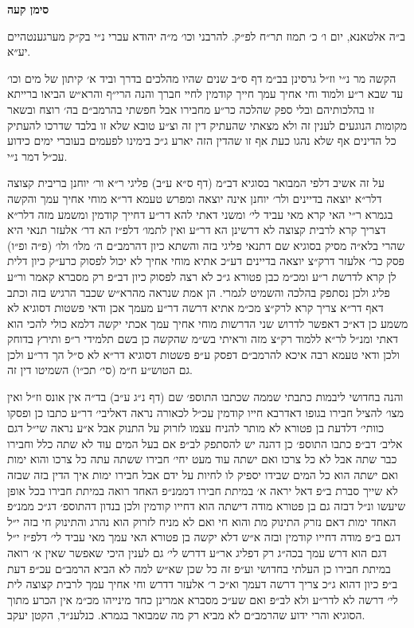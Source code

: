 \documentclass[12pt, openany]{book}
\newcommand{\chapname}{}
\newcommand{\newchap}[1]{
	\addcontentsline{toc}{chapter}{#1}
	\renewcommand{\chapname}{#1}
		\begin{center}
			\textbf{%
\fontsize{16pt}{16pt}\selectfont
				#1}
		\end{center}
}
\begin{document}
\newchap{סימן קעה}
\begin{multicols}{2}
ב״ה אלטאנא, יום ו׳ כ׳ תמוז תר״ח לפ״ק. להרבני וכו׳ מ״ה יהודא עברי נ״י בק״ק מערגענטהיים יע״א.\\\vspace{0pt}

הקשה מר נ״י וז״ל גרסינן בב״מ דף ס״ב שנים שהיו מהלכים בדרך וביד א׳ קיתון של מים וכו׳ עד שבא ר״ע ולמוד וחי אחיך עמך חייך קודמין לחיי חברך והנה הרי״ף והרא״ש הביאו ברייתא זו בהלכותיהם ובלי ספק שהלכה כר״ע מחבירו אבל חפשתי בהרמב״ם בה׳ רוצח ובשאר מקומות הנוגעים לענין זה ולא מצאתי שהעתיק דין זה וצ״ע טובא שלא זו בלבד שדרכו להעתיק כל הדינים אף שלא נהגו כעת אף זו שהדין הזה יארע ג״כ בימינו לפעמים בעוברי ימים כידוע עכ״ל דמר נ״י.\\\vspace{0pt}

על זה אשיב דלפי המבואר בסוגיא דב״מ (דף ס״א ע״ב) פליגי ר״א ור׳ יוחנן בריבית קצוצה דלר״א יוצאה בדיינים ולר׳ יוחנן אינה יוצאה ומפרש טעמא דר״א מוחי אחיך עמך והקשה בגמרא ר״י האי קרא מאי עביד לי׳ ומשני דאתי להא דר״ע דחייך קודמין ומשמע מזה דלר״א דצריך קרא לרבית קצוצה לא דרשינן הא דר״ע ואין לתמו׳ דלפ״ז הא דר׳ אלעזר תנאי היא שהרי בלא״ה מסיק בסוגיא שם דתנאי פליגי בזה והשתא כיון דהרמב״ם ה׳ מלו׳ ולו׳ (פ״ה ופ״ו) פסק כר׳ אלעזר דרק״צ יוצאה בדיינים דע״כ אתיא מוחי אחיך לא יכול לפסוק כרע״ק כיון דלית לן קרא לדרשת ר״ע ומכ״מ כבן פטורא ג״כ לא רצה לפסוק כיון דב״פ רק מסברא קאמר ור״ע פליג ולכן נסתפק בהלכה והשמיט לגמרי. הן אמת שנראה מהרא״ש שכבר הרגיש בזה וכתב דאף דר״א צריך קרא לרק״צ מכ״מ אתיא דרשה דר״ע מעמך אכן ודאי פשטות דסוגיא לא משמע כן דא״כ דאפשר לדרוש שני הדרשות מוחי אחיך עמך אכתי יקשה דלמא כולי להכי הוא דאתי ומנ״ל לר״א ללמוד רק״צ מזה וראיתי בש״מ שהקשה כן בשם תלמידי ר״פ ותירץ בדוחק ולכן ודאי טעמא רבה איכא להרמב״ם דפסק ע״פ פשטות דסוגיא דר״א לא ס״ל הך דר״ע ולכן גם הטוש״ע ח״מ (סי׳ תכ״ו) השמיטו דין זה.\\\vspace{0pt}

והנה בחדושי ליבמות כתבתי שממה שכתבו התוספ׳ שם (דף נ״ג ע״ב) בד״ה אין אונס וז״ל ואין מצו׳ להציל חבירו בגופו דאדרבא חייו קודמין עכ״ל לכאורה נראה דאליבי׳ דר״ע כתבו כן ופסקו כוותי׳ דלדעת בן פטורא לא מותר להניח עצמו לזרוק על התנוק אבל א״ע נראה שי״ל דגם אליב׳ דב״פ כתבו התוספ׳ כן דהנה יש להסתפק לב״פ אם בעל המים עוד לא שתה כלל וחבירו כבר שתה אבל לא כל צרכו ואם ישתה עוד מעט יחי׳ חבירו ששתה עתה כל צרכו והוא ימות ואם ישתה הוא כל המים שבידו יספיק לו לחיות על ידם אבל חבירו ימות איך הדין בזה שבזה לא שייך סברת ב״פ דאל יראה א׳ במיתת חבירו דממנ״פ האחד רואה במיתת חבירו בכל אופן שיעשו ונ״ל דבזה גם בן פטורא מודה דישתה הוא דחייו קודמין ולכן בנדון דהתוספ׳ דג״כ ממנ״פ האחד ימות דאם נזרק התינוק מת והוא חי ואם לא מניח לזרוק הוא נהרג והתינוק חי בזה י״ל דגם ב״פ מודה דחייו קודמין ובזה א״ש דלא יקשה בן פטורא האי עמך מאי עביד לי׳ דלפ״ז י״ל דגם הוא דרש עמך בכה״ג רק דפליג אר״ע דדרש לי׳ גם לענין היכי שאפשר שאין א׳ רואה במיתת חבירו כן העלתי בחדושי וע״פ זה כל שכן שא״ש למה לא הביא הרמב״ם עכ״פ דעת ב״פ כיון דהוא ג״כ צריך דרשה דעמך וא״כ ר׳ אלעזר דדרש וחי אחיך עמך לרבית קצוצה לית לי׳ דרשה לא לדר״ע ולא לב״פ ואם שע״כ מסברא אמרינן כחד מינייהו מכ״מ אין הכרע מתוך הסוגיא והרי ידוע שהרמב״ם לא מביא רק מה שמבואר בגמרא. כנלענ״ד, הקטן יעקב.\\\vspace{0pt}


\end{multicols}
\end{document}
